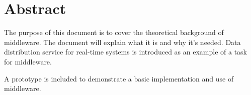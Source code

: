\chapter*{Abstract}
The purpose of this document is to cover the theoretical background of middleware. The document will explain what it is and why it's needed. Data distribution service for real-time systems is introduced as an example of a task for middleware.

A prototype is included to demonstrate a basic implementation and use of middleware. 
